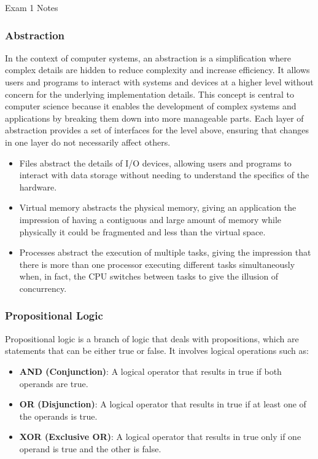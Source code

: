 \begin{examnotes}{Exam 1 Notes}
    \subsubsection*{Abstraction}

    In the context of computer systems, an abstraction is a simplification where complex details are hidden to reduce complexity and increase efficiency. It allows users and programs to interact with 
    systems and devices at a higher level without concern for the underlying implementation details. This concept is central to computer science because it enables the development of complex systems 
    and applications by breaking them down into more manageable parts. Each layer of abstraction provides a set of interfaces for the level above, ensuring that changes in one layer do not necessarily 
    affect others.

    \begin{itemize}
        \item Files abstract the details of I/O devices, allowing users and programs to interact with data storage without needing to understand the specifics of the hardware.
        \item Virtual memory abstracts the physical memory, giving an application the impression of having a contiguous and large amount of memory while physically it could be fragmented and less than 
        the virtual space.
        \item Processes abstract the execution of multiple tasks, giving the impression that there is more than one processor executing different tasks simultaneously when, in fact, the CPU switches 
        between tasks to give the illusion of concurrency.
    \end{itemize}

    \subsubsection*{Propositional Logic}

    Propositional logic is a branch of logic that deals with propositions, which are statements that can be either true or false. It involves logical operations such as:

    \begin{itemize}
        \item \textbf{AND (Conjunction)}: A logical operator that results in true if both operands are true.
        \item \textbf{OR (Disjunction)}: A logical operator that results in true if at least one of the operands is true.
        \item \textbf{XOR (Exclusive OR)}: A logical operator that results in true only if one operand is true and the other is false.
    \end{itemize}


\end{examnotes}
